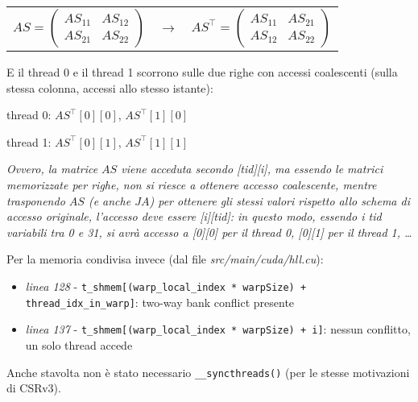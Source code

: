 \documentclass[a4paper,9pt]{extarticle}
\begin{document}
\begin{minipage}{\linewidth}
\centering
\begin{tabular}{c c c} 
$
AS =
\begin{pmatrix}
AS_{11} & AS_{12} \\
AS_{21} & AS_{22}
\end{pmatrix}
$ &
$\rightarrow$ &
$
AS^{\top} =
\begin{pmatrix}
AS_{11} & AS_{21} \\
AS_{12} & AS_{22}
\end{pmatrix}
$ \\
\end{tabular}
\end{minipage}
\vspace{\baselineskip}

E il thread 0 e il thread 1 scorrono sulle due righe con accessi coalescenti (sulla stessa colonna, accessi allo stesso
istante):
\vspace{\baselineskip}

\begin{minipage}{\linewidth}
\centering
thread 0: $AS^{\top}[0][0]$, $AS^{\top}[1][0]$

thread 1: $AS^{\top}[0][1]$, $AS^{\top}[1][1]$
\end{minipage}
\vspace{\baselineskip}

\textit{Ovvero, la matrice $AS$ viene acceduta secondo [tid][i], ma essendo le matrici memorizzate
per righe, non si riesce a ottenere accesso coalescente, mentre trasponendo $AS$ (e anche $JA$)
per ottenere gli stessi valori rispetto allo schema di accesso originale, 
l'accesso deve essere [i][tid]: in questo modo, essendo i tid
variabili tra 0 e 31, si avrà accesso a [0][0] per il thread 0, [0][1] per il thread 1, \dots}

Per la memoria condivisa invece (dal file \textit{src/main/cuda/hll.cu}):
\begin{itemize}
	\item \textit{linea 128} - \texttt{t\_shmem[(warp\_local\_index * warpSize) + thread\_idx\_in\_warp]}: two-way bank conflict presente
	\item \textit{linea 137} - \texttt{t\_shmem[(warp\_local\_index * warpSize) + i]}: nessun conflitto, un solo thread accede
\end{itemize}

Anche stavolta non è stato necessario \texttt{\_\_syncthreads()} (per le stesse motivazioni
di CSRv3).
\end{document}
